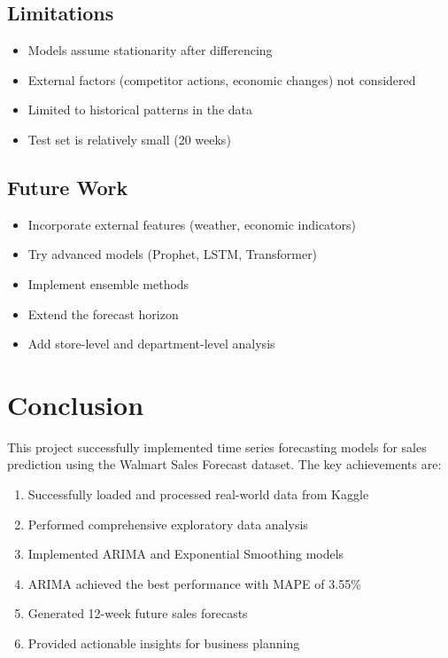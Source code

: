 \documentclass[12pt,a4paper]{report}
\begin{document}
\section{Limitations}
\begin{itemize}
    \item Models assume stationarity after differencing
    \item External factors (competitor actions, economic changes) not considered
    \item Limited to historical patterns in the data
    \item Test set is relatively small (20 weeks)
\end{itemize}

\section{Future Work}
\begin{itemize}
    \item Incorporate external features (weather, economic indicators)
    \item Try advanced models (Prophet, LSTM, Transformer)
    \item Implement ensemble methods
    \item Extend the forecast horizon
    \item Add store-level and department-level analysis
\end{itemize}

\chapter{Conclusion}
\label{ch:conclusion}

This project successfully implemented time series forecasting models for sales prediction using the Walmart Sales Forecast dataset. The key achievements are:

\begin{enumerate}
    \item Successfully loaded and processed real-world data from Kaggle
    \item Performed comprehensive exploratory data analysis
    \item Implemented ARIMA and Exponential Smoothing models
    \item ARIMA achieved the best performance with MAPE of 3.55\%
    \item Generated 12-week future sales forecasts
    \item Provided actionable insights for business planning
\end{enumerate}
\end{document}
